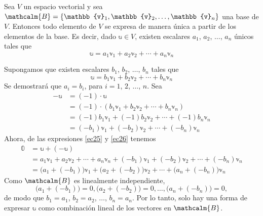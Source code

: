 \begin{theorem}{}{}
    Sea $V$ un espacio vectorial y sea $\mathcalm{B} = \{ \mathbb{v}_1, \mathbb{v}_2, \dots, \mathbb{v}_n \}$ una base de $V$. Entonces todo elemento de $V$ se expresa de manera única a partir de los elementos de la base. Es decir, dado $\mathbb{u} \in V$, existen escalares $a_1$, $a_2$, $\dots$, $a_n$ únicos tales que
    \begin{equation}
        \mathbb{u} = a_1\mathbb{v}_1 + a_2\mathbb{v}_2 + \cdots + a_n\mathbb{v}_n \label{ec25}
    \end{equation}

    \tcblower
    \demostracion Supongamos que existen escalares $b_1$, $b_2$, $\dots$, $b_n$ tales que
    \begin{equation}
        \mathbb{u} = b_1\mathbb{v}_1 + b_2\mathbb{v}_2 + \cdots + b_n\mathbb{v}_n \label{ec26}
    \end{equation}
    Se demostrará que $a_i = b_i$, para $i = 1$, $2$, $\dots$, $n$. Sea
    \begin{align*}
        -\mathbb{u} & = (-1) \cdot \mathbb{u} \\
        & = (-1) \cdot (b_1\mathbb{v}_1 + b_2\mathbb{v}_2 + \cdots + b_n\mathbb{v}_n) \\
        & = (-1)b_1\mathbb{v}_1 + (-1)b_2\mathbb{v}_2 + \cdots + (-1)b_n\mathbb{v}_n \\
        & = (-b_1)\mathbb{v}_1 + (-b_2)\mathbb{v}_2 + \cdots + (-b_n)\mathbb{v}_n
    \end{align*}
    Ahora, de las expresiones \eqref{ec25} y \eqref{ec26} tenemos
    \begin{align*}
        \mathbb{0} & = \mathbb{u} + (-\mathbb{u}) \\
        & = a_1\mathbb{v}_1 + a_2\mathbb{v}_2 + \cdots + a_n\mathbb{v}_n + (-b_1)\mathbb{v}_1 + (-b_2)\mathbb{v}_2 + \cdots + (-b_n)\mathbb{v}_n \\
        & = \big(a_1+(-b_1)\big)\mathbb{v}_1 + \big(a_2+(-b_2)\big)\mathbb{v}_2 + \cdots + \big(a_n+(-b_n)\big)\mathbb{v}_n
    \end{align*}
    Como $\mathcalm{B}$ es linealmente independiente,
    $$\big(a_1+(-b_1)\big) = 0, \big(a_2+(-b_2)\big) = 0, \dots, \big(a_n+(-b_n)\big) = 0,$$
    de modo que $b_1 = a_1$, $b_2 = a_2$, $\dots$, $b_n = a_n$. Por lo tanto, solo hay una forma de expresar $\mathbb{u}$ como combinación lineal de los vectores en $\mathcalm{B}$.
\end{theorem}

\newpage

